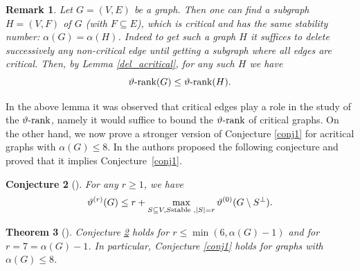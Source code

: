 \documentclass[11pt]{article}
\newcommand{\ignore}[1]{}
\newtheorem{theorem}{Theorem}[section]
\newtheorem{lemma}[theorem]{Lemma}
\newtheorem{conjecture}[theorem]{Conjecture}
\newtheorem{remark}[theorem]{Remark}
\numberwithin{equation}{section}
\newcommand{\MK}{{\mathcal K}}
\newcommand{\rrank}{\vartheta\text{\rm -rank}}
\begin{document}
 \begin{remark}\label{rem-critical}
Let  $G=(V,E)$ be a graph. Then one can find a subgraph $H=(V,F)$ of $G$ (with $F\subseteq E$), which is critical and has the same stability number: $\alpha (G)=\alpha (H)$. Indeed to get such a graph $H$ it suffices to delete successively  any non-critical edge until getting a subgraph where all edges are critical.
 Then, by Lemma \ref{del_acritical},  for any such $H$ we have
 \begin{equation}\label{eqGH}
 \rrank(G)\le \rrank(H).
 \end{equation}
 \end{remark}
 \ignore{
\begin{lemma}\label{indu-same-alpha}
Let $G=(V,E)$ be a graph and let $H$ be an induced subgraph of $G$ such that $\alpha(G)=\alpha(H)=\alpha$. Then, $\rrank(H)\leq \rrank(G)$. 
\end{lemma}
\begin{proof}
Let $M_G=\alpha(A_G+I)-J$ and $M_H=\alpha(A_H+I)-J$. Since $H$ is an induced subgraph of $G$ then $M_H$ is a principal submatrix of $M_G$. Then $M_G\in \MK^{(r)}$ implies $M_H\in \MK^{(r)}$, hence $\rrank(H)\leq \rrank(G)$. 
\end{proof}
}




In the above lemma it was observed that critical edges play a role in the study of the $\rrank $, namely it would suffice to bound the $\rrank$ of critical graphs.  On the other hand, we now prove a stronger version of Conjecture \ref{conj1} for acritical graphs with $\alpha(G)\leq 8$. 
In \cite{GL2007} the authors proposed the following conjecture and proved that it  implies Conjecture~\ref{conj1}.

\begin{conjecture}[\cite{GL2007}]\label{conjecture-monique}	
	For any $r\geq 1$, we have
	\begin{equation}\label{eq-monique}
	\vartheta^{(r)}(G)\leq r + \max\limits_{S\subseteq V, S \text{\rm stable },|S|=r} \vartheta^{(0)}(G\setminus S^\perp).
	\end{equation}
\end{conjecture}

\begin{theorem}[\cite{GL2007}]\label{theoGLstrong}
Conjecture \ref{conjecture-monique} holds for $r\leq \min(6,\alpha(G)-1)$ and for $r=7=\alpha(G)-1$. In particular, 
Conjecture \ref{conj1} holds for graphs with $\alpha(G)\leq 8$.
\end{theorem}
\end{document}
